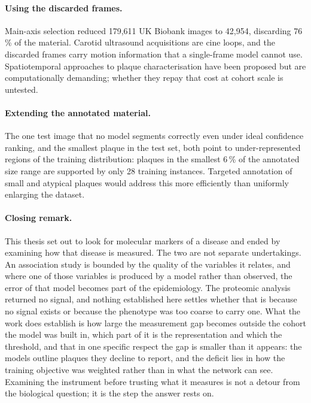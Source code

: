 \paragraph{Using the discarded frames.}
Main-axis selection reduced 179{,}611 UK Biobank images to 42{,}954, discarding 76\,\% of the
material. Carotid ultrasound acquisitions are cine loops, and the discarded frames carry motion
information that a single-frame model cannot use. Spatiotemporal approaches to plaque
characterisation have been proposed but are computationally demanding; whether they repay that
cost at cohort scale is untested.

\paragraph{Extending the annotated material.}
The one test image that no model segments correctly even under ideal confidence ranking, and the
smallest plaque in the test set, both point to under-represented regions of the training
distribution: plaques in the smallest 6\,\% of the annotated size range are supported by only 28
training instances. Targeted annotation of small and atypical plaques would address this more
efficiently than uniformly enlarging the dataset.

\paragraph{Closing remark.}
This thesis set out to look for molecular markers of a disease and ended by examining how that
disease is measured. The two are not separate undertakings. An association study is bounded by
the quality of the variables it relates, and where one of those variables is produced by a model
rather than observed, the error of that model becomes part of the epidemiology. The proteomic
analysis returned no signal, and nothing established here settles whether that is because no
signal exists or because the phenotype was too coarse to carry one. What the work does establish
is how large the measurement gap becomes outside the cohort the model was built in, which part of
it is the representation and which the threshold, and that in one specific respect the gap is
smaller than it appears: the models outline plaques they decline to report, and the deficit lies
in how the training objective was weighted rather than in what the network can see. Examining the
instrument before trusting what it measures is not a detour from the biological question; it is
the step the answer rests on.
